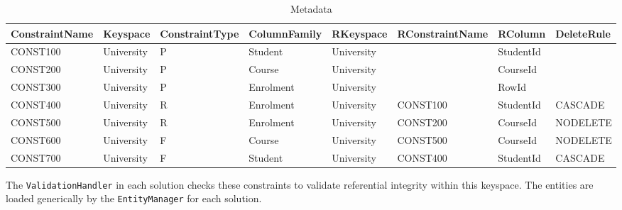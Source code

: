 \begin{table}[h] \label{texp:ListConstraints}
\centering
\caption{Metadata}	
	\begin{tabular}{CCC CCC CC}
		\toprule
		\bfseries ConstraintName & \bfseries Keyspace & \bfseries ConstraintType &
		\bfseries ColumnFamily & \bfseries RKeyspace & \bfseries RConstraintName &
		\bfseries RColumn & \bfseries DeleteRule\\
		\midrule
		CONST100 & University & P & Student & University & & StudentId &\\
		\rc CONST200 & University & P & Course & University & & CourseId &\\
		CONST300 & University & P & Enrolment & University & & RowId &\\
		\rc CONST400 & University & R & Enrolment & University & CONST100 & StudentId
		& CASCADE\\
		CONST500 & University & R & Enrolment & University & CONST200 & CourseId &
		NODELETE\\
		\rc CONST600 & University & F & Course & University & CONST500 & CourseId &
		NODELETE\\
		CONST700 & University & F & Student & University & CONST400 & StudentId &
		CASCADE\\
		\bottomrule
	\end{tabular}
\end{table}

The \texttt{ValidationHandler} in each solution checks these constraints to
validate referential integrity within this keyspace. The entities are loaded
generically by the \texttt{EntityManager} for each solution. 
% 	
% 			
% 			


